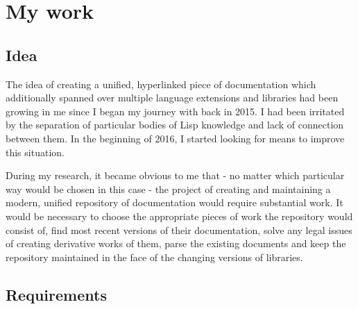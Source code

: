 \section{My work}

\subsection{Idea}

The idea of creating a unified, hyperlinked piece of \cl{} documentation which additionally spanned over multiple language extensions and libraries had been growing in me since I began my journey with \cl{} back in 2015. I had been irritated by the separation of particular bodies of Lisp knowledge and lack of connection between them. In the beginning of 2016, I started looking for means to improve this situation.

During my research, it became obvious to me that - no matter which particular way would be chosen in this case - the project of creating and maintaining a modern, unified repository of \cl{} documentation would require substantial work. It would be necessary to choose the appropriate pieces of work the repository would consist of, find most recent versions of their documentation, solve any legal issues of creating derivative works of them, parse the existing documents and keep the repository maintained in the face of the changing versions of \cl{} libraries.

\subsection{Requirements} \label{requirements}

